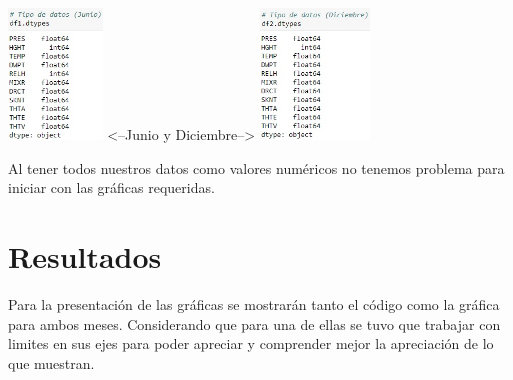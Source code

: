 \documentclass[12pt]{article}
\begin{document}
\begin{center}
	\includegraphics[height=3.5cm]{tipoj.jpg} <--Junio y Diciembre-->       
    \includegraphics[height=3.5cm]{tipod.jpg}
\end{center}
Al tener todos nuestros datos como valores numéricos no tenemos problema para iniciar con las gráficas requeridas.

\section*{Resultados}
 Para la presentación de las gráficas se mostrarán tanto el código como la gráfica para ambos meses. Considerando que para una de ellas se tuvo que trabajar con limites en sus ejes para poder apreciar y comprender mejor la apreciación de lo que muestran.\\
 
\end{document}
